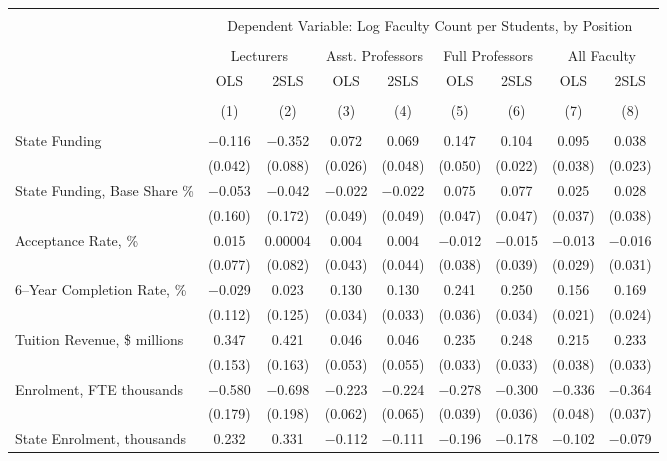 
\begin{tabular}{@{\extracolsep{5pt}}lcccccccc} 
\\[-1.8ex]\hline 
\hline \\[-1.8ex] 
 & \multicolumn{8}{c}{Dependent Variable: Log Faculty Count per Students, by Position} \\ 
\cline{2-9} 
\\[-1.8ex] & \multicolumn{2}{c}{Lecturers} & \multicolumn{2}{c}{Asst. Professors} & \multicolumn{2}{c}{Full Professors} & \multicolumn{2}{c}{All Faculty} \\ 
 & OLS & 2SLS & OLS & 2SLS & OLS & 2SLS & OLS & 2SLS \\ 
\\[-1.8ex] & (1) & (2) & (3) & (4) & (5) & (6) & (7) & (8)\\ 
\hline \\[-1.8ex] 
 State Funding & $-$0.116 & $-$0.352 & 0.072 & 0.069 & 0.147 & 0.104 & 0.095 & 0.038 \\ 
  & (0.042) & (0.088) & (0.026) & (0.048) & (0.050) & (0.022) & (0.038) & (0.023) \\ 
  State Funding, Base Share \% & $-$0.053 & $-$0.042 & $-$0.022 & $-$0.022 & 0.075 & 0.077 & 0.025 & 0.028 \\ 
  & (0.160) & (0.172) & (0.049) & (0.049) & (0.047) & (0.047) & (0.037) & (0.038) \\ 
  Acceptance Rate, \% & 0.015 & 0.00004 & 0.004 & 0.004 & $-$0.012 & $-$0.015 & $-$0.013 & $-$0.016 \\ 
  & (0.077) & (0.082) & (0.043) & (0.044) & (0.038) & (0.039) & (0.029) & (0.031) \\ 
  6--Year Completion Rate, \% & $-$0.029 & 0.023 & 0.130 & 0.130 & 0.241 & 0.250 & 0.156 & 0.169 \\ 
  & (0.112) & (0.125) & (0.034) & (0.033) & (0.036) & (0.034) & (0.021) & (0.024) \\ 
  Tuition Revenue, \$ millions & 0.347 & 0.421 & 0.046 & 0.046 & 0.235 & 0.248 & 0.215 & 0.233 \\ 
  & (0.153) & (0.163) & (0.053) & (0.055) & (0.033) & (0.033) & (0.038) & (0.033) \\ 
  Enrolment, FTE thousands & $-$0.580 & $-$0.698 & $-$0.223 & $-$0.224 & $-$0.278 & $-$0.300 & $-$0.336 & $-$0.364 \\ 
  & (0.179) & (0.198) & (0.062) & (0.065) & (0.039) & (0.036) & (0.048) & (0.037) \\ 
  State Enrolment, thousands & 0.232 & 0.331 & $-$0.112 & $-$0.111 & $-$0.196 & $-$0.178 & $-$0.102 & $-$0.079 \\ 

\end{tabular}
